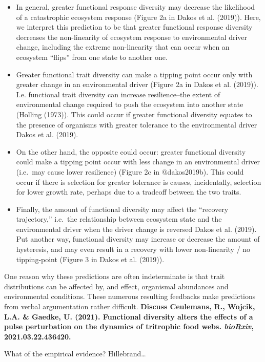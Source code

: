\documentclass{article}
\begin{document}
\begin{itemize}
\item
  In general, greater functional response diversity may decrease the
  likelihood of a catastrophic ecosystem response (Figure 2a in Dakos et
  al. (2019)). Here, we interpret this prediction to be that greater
  functional response diversity decreases the non-linearity of ecosystem
  response to environmental driver change, including the extreme
  non-linearity that can occur when an ecosystem ``flips'' from one
  state to another one.
\item
  Greater functional trait diversity can make a tipping point occur only
  with greater change in an environmental driver (Figure 2a in Dakos et
  al. (2019)). I.e. functional trait diversity can increase
  resilience--the extent of environmental change required to push the
  ecosystem into another state (Holling (1973)). This could occur if
  greater functional diversity equates to the presence of organisms with
  greater tolerance to the environmental driver Dakos et al. (2019).
\item
  On the other hand, the opposite could occur: greater functional
  diversity could make a tipping point occur with less change in an
  environmental driver (i.e.~may cause lower resilience) (Figure 2c in
  @dakos2019b). This could occur if there is selection for greater
  tolerance is causes, incidentally, selection for lower growth rate,
  perhaps due to a tradeoff between the two traits.
\item
  Finally, the amount of functional diversity may affect the ``recovery
  trajectory,'' i.e.~the relationship between ecosystem state and the
  environmental driver when the driver change is reversed Dakos et al.
  (2019). Put another way, functional diversity may increase or decrease
  the amount of hysteresis, and may even result in a recovery with lower
  non-linearity / no tipping-point (Figure 3 in Dakos et al. (2019)).
\end{itemize}

One reason why these predictions are often indeterminate is that trait
distributions can be affected by, and effect, organismal abundances and
environmental conditions. These numerous resulting feedbacks make
predictions from verbal argumentation rather difficult. \textbf{Discuss
Ceulemans, R., Wojcik, L.A. \& Gaedke, U. (2021). Functional diversity
alters the effects of a pulse perturbation on the dynamics of tritrophic
food webs. \emph{bioRxiv}, 2021.03.22.436420.}

What of the empirical evidence? Hillebrand\ldots{}
\end{document}

